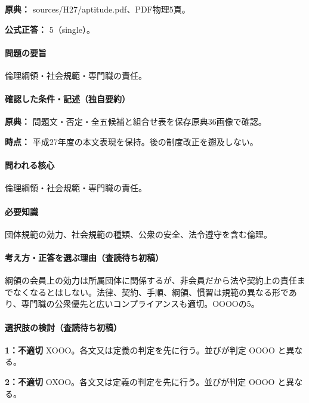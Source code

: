 \noindent\textbf{原典：} sources/H27/aptitude.pdf、PDF物理5頁。

\textbf{公式正答：} 5（single）。

\paragraph{問題の要旨} 倫理綱領・社会規範・専門職の責任。

\paragraph{確認した条件・記述（独自要約）}\mbox{}\par

\noindent\textbf{原典：} 問題文・否定・全五候補と組合せ表を保存原典36画像で確認。\par

\noindent\textbf{時点：} 平成27年度の本文表現を保持。後の制度改正を遡及しない。\par

\paragraph{問われる核心} 倫理綱領・社会規範・専門職の責任。

\paragraph{必要知識} 団体規範の効力、社会規範の種類、公衆の安全、法令遵守を含む倫理。

\paragraph{考え方・正答を選ぶ理由（査読待ち初稿）} 綱領の会員上の効力は所属団体に関係するが、非会員だから法や契約上の責任までなくなるとはしない。法律、契約、手順、綱領、慣習は規範の異なる形であり、専門職の公衆優先と広いコンプライアンスも適切。OOOOの5。

\paragraph{選択肢の検討（査読待ち初稿）}\mbox{}\par

\noindent\textbf{1：不適切} XOOO。各文又は定義の判定を先に行う。並びが判定 OOOO と異なる。\par

\noindent\textbf{2：不適切} OXOO。各文又は定義の判定を先に行う。並びが判定 OOOO と異なる。\par

